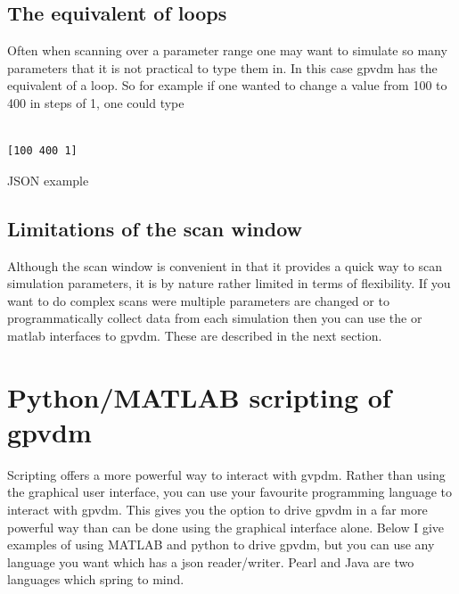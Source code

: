 \subsection{The equivalent of loops}
Often when scanning over a parameter range one may want to simulate so many parameters that it is not practical to type them in.  In this case gpvdm has the equivalent of a loop. So for example if one wanted to change a value from 100 to 400 in steps of 1, one could type

\begin{listing}[H]
\begin{verbatim}

[100 400 1]

\end{verbatim}
\caption{JSON example} 
\label{json-example}
\end{listing}

\subsection{Limitations of the scan window}
Although the scan window is convenient in that it provides a quick way to scan simulation parameters, it is by nature rather limited in terms of flexibility. If you want to do complex scans were multiple parameters are changed or to programmatically collect data from each simulation then you can use the  or matlab interfaces to gpvdm.  These are described in the next section.

\section{Python/MATLAB scripting of gpvdm}
Scripting offers a more powerful way to interact with gvpdm. Rather than using the graphical user interface, you can use your favourite programming language to interact with gpvdm.  This gives you the option to drive gpvdm in a far more powerful way than can be done using the graphical interface alone.  Below I give examples of using MATLAB and python to drive gpvdm, but you can use any language you want which has a json reader/writer.  Pearl and Java are two languages which spring to mind.

